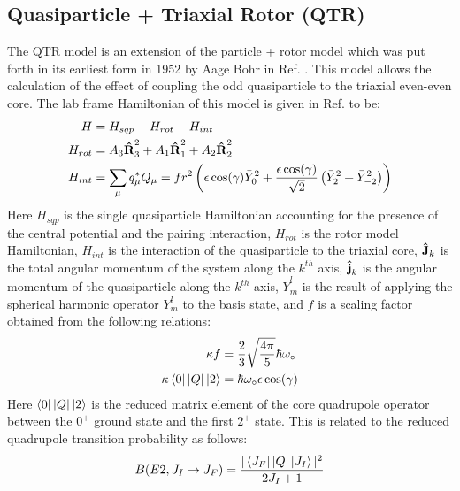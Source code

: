 \subsection{Quasiparticle + Triaxial Rotor (QTR)}
\label{sec:models-qtr}
The QTR model is an extension of the particle + rotor model which was put forth in its earliest form in 1952 by Aage Bohr in Ref. \cite{bohrParticlePlusRotor}. This model allows the calculation of the effect of coupling the odd quasiparticle to the triaxial even-even core. The lab frame Hamiltonian of this model is given in Ref. \cite{frauendorfTransverseWobbling} to be:
\begin{align}
\label{eqn:chp2-qtr-hamil}
H&=H_{sqp}+H_{rot}-H_{int}\\
H_{rot}&=A_3\boldsymbol{\hat{\textbf{R}}}_3^2+A_1\boldsymbol{\hat{\textbf{R}}}_1^2+A_2\boldsymbol{\hat{\textbf{R}}}_2^2\\
H_{int}&= \sum\limits_{\mu}^{}q^*_{\mu}Q_{\mu} = f r^2 \left(\epsilon \cos(\gamma) \bar{Y}^2_0 + \frac{\epsilon \cos(\gamma)}{\sqrt{2}}\left(\bar{Y}^2_2 + \bar{Y}^2_{-2}\right)\right)
\end{align}
Here $H_{sqp}$ is the single quasiparticle Hamiltonian accounting for the presence of the central potential and the pairing interaction, $H_{rot}$ is the rotor model Hamiltonian, $H_{int}$ is the interaction of the quasiparticle to the triaxial core, $\boldsymbol{\hat{\textbf{J}}}_k$ is the total angular momentum of the system along the $k^{th}$ axis, $\boldsymbol{\hat{\textbf{j}}}_k$ is the angular momentum of the quasiparticle along the $k^{th}$ axis, $\bar{Y}^l_m$ is the result of applying the spherical harmonic operator $Y^l_m$ to the basis state, and $f$ is a scaling factor obtained from the following relations:
\begin{align}
\label{eqn:chp2-qtr-int-hamil-scaling}
\kappa f &= \frac{2}{3}\sqrt{\frac{4\pi}{5}}\hbar\omega_{\circ}\\
\kappa \Bra{0}|Q|\Ket{2} & = \hbar\omega_{\circ} \epsilon \cos(\gamma)
\end{align}
Here $\Bra{0}|Q|\Ket{2}$ is the reduced matrix element of the core quadrupole operator between the  $0^+$ ground state and the first $2^+$ state. This is related to the reduced quadrupole transition probability as follows:
\begin{equation}
\label{eqn:chp2-red-mat-el-to-red-trans-prob}
B(E2,J_I\rightarrow{}J_F)=\frac{|\Bra{J_F}|Q|\Ket{J_I}|^2}{2J_I+1}
\end{equation}

